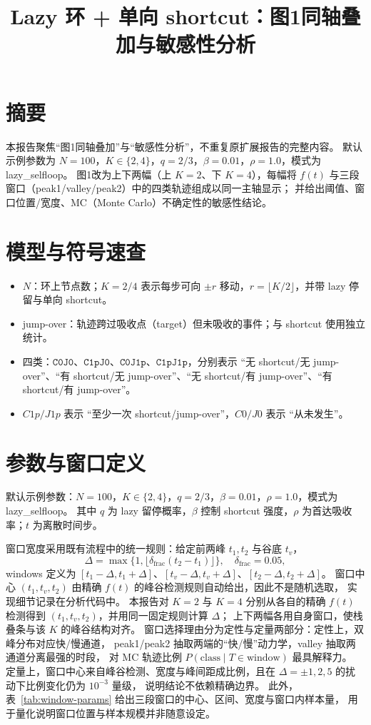 \documentclass[11pt,fontset=fandol]{ctexart}
\title{Lazy 环 + 单向 shortcut：图1同轴叠加与敏感性分析}
\author{}
\date{}
\begin{document}
\maketitle

\section*{摘要}
本报告聚焦“图1同轴叠加”与“敏感性分析”，不重复原扩展报告的完整内容。
默认示例参数为 $N=100$，$K\in\{2,4\}$，$q=2/3$，$\beta=0.01$，$\rho=1.0$，模式为 lazy\_selfloop。
图1改为上下两幅（上 $K=2$、下 $K=4$），每幅将 $f(t)$ 与三段窗口（peak1/valley/peak2）中的四类轨迹组成以同一主轴显示；
并给出阈值、窗口位置/宽度、MC（Monte Carlo）不确定性的敏感性结论。

\section*{模型与符号速查}
\begin{itemize}
  \item $N$：环上节点数；$K=2/4$ 表示每步可向 $\pm r$ 移动，$r=\lfloor K/2 \rfloor$，并带 lazy 停留与单向 shortcut。
  \item jump-over：轨迹跨过吸收点（target）但未吸收的事件；与 shortcut 使用独立统计。
  \item 四类：$\texttt{C0J0}$、$\texttt{C1pJ0}$、$\texttt{C0J1p}$、$\texttt{C1pJ1p}$，分别表示
        “无 shortcut/无 jump-over”、“有 shortcut/无 jump-over”、“无 shortcut/有 jump-over”、“有 shortcut/有 jump-over”。
  \item $C1p/J1p$ 表示 “至少一次 shortcut/jump-over”，$C0/J0$ 表示 “从未发生”。
\end{itemize}

\section*{参数与窗口定义}
默认示例参数：$N=100$，$K\in\{2,4\}$，$q=2/3$，$\beta=0.01$，$\rho=1.0$，模式为 lazy\_selfloop。
其中 $q$ 为 lazy 留停概率，$\beta$ 控制 shortcut 强度，$\rho$ 为首达吸收率；$t$ 为离散时间步。

窗口宽度采用既有流程中的统一规则：给定前两峰 $t_1,t_2$ 与谷底 $t_v$，
\[
\Delta=\max\{1,\lfloor \delta_{\text{frac}}(t_2-t_1)\rfloor\},\quad \delta_{\text{frac}}=0.05,
\]
windows 定义为
$[t_1-\Delta,t_1+\Delta]$、$[t_v-\Delta,t_v+\Delta]$、$[t_2-\Delta,t_2+\Delta]$。
窗口中心 $(t_1,t_v,t_2)$ 由精确 $f(t)$ 的峰谷检测规则自动给出，因此不是随机选取，
实现细节记录在分析代码中。
本报告对 $K=2$ 与 $K=4$ 分别从各自的精确 $f(t)$ 检测得到 $(t_1,t_v,t_2)$，并用同一固定规则计算 $\Delta$；
上下两幅各用自身窗口，使栈叠条与该 $K$ 的峰谷结构对齐。
窗口选择理由分为定性与定量两部分：定性上，双峰分布对应快/慢通道，
peak1/peak2 抽取两端的“快/慢”动力学，valley 抽取两通道分离最强的时段，
对 MC 轨迹比例 $P(\text{class}\mid T\in\text{window})$ 最具解释力。
定量上，窗口中心来自峰谷检测、宽度与峰间距成比例，且在 $\Delta=\pm 1,2,5$ 的扰动下比例变化仍为 $10^{-3}$ 量级，
说明结论不依赖精确边界。
此外，表~\ref{tab:window-params} 给出三段窗口的中心、区间、宽度与窗口内样本量，
用于量化说明窗口位置与样本规模并非随意设定。
\end{document}
